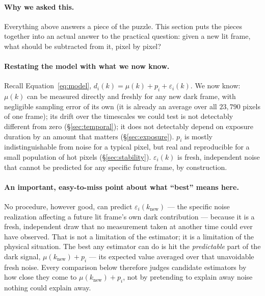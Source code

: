 \documentclass[11pt,a4paper]{article}
\begin{document}
\paragraph{Why we asked this.}
Everything above answers a piece of the puzzle. This section puts the
pieces together into an actual answer to the practical question: given a
new lit frame, what should be subtracted from it, pixel by pixel?

\paragraph{Restating the model with what we now know.}
Recall Equation~\ref{eq:model}, $d_i(k) = \mu(k) + p_i + \varepsilon_i(k)$.
We now know: $\mu(k)$ can be measured directly and freshly for any new dark
frame, with negligible sampling error of its own (it is already an average
over all $23{,}790$ pixels of one frame); its drift over the timescales we
could test is not detectably different from zero (\S\ref{sec:temporal}); it
does not detectably depend on exposure duration by an amount that matters
(\S\ref{sec:exposure}). $p_i$ is mostly indistinguishable from noise for a
typical pixel, but real and reproducible for a small population of hot
pixels (\S\ref{sec:stability}). $\varepsilon_i(k)$ is fresh, independent
noise that cannot be predicted for any specific future frame, by
construction.

\paragraph{An important, easy-to-miss point about what ``best'' means here.}
No procedure, however good, can predict $\varepsilon_i(k_{\mathrm{new}})$
--- the specific noise realization affecting a future lit frame's own dark
contribution --- because it is a fresh, independent draw that no
measurement taken at another time could ever have observed. That is not a
limitation of the estimator; it is a limitation of the physical situation.
The best any estimator can do is hit the \emph{predictable} part of the
dark signal, $\mu(k_{\mathrm{new}}) + p_i$ --- its expected value averaged
over that unavoidable fresh noise. Every comparison below therefore judges
candidate estimators by how close they come to $\mu(k_{\mathrm{new}}) +
p_i$, not by pretending to explain away noise nothing could explain away.
\end{document}
